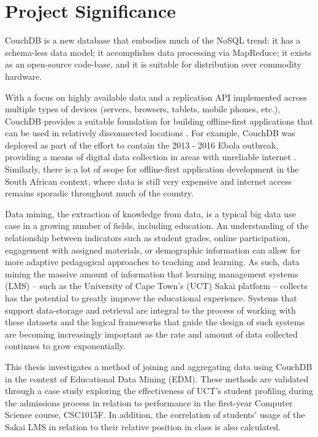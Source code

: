 \section{Project Significance}
CouchDB \cite{theCouch} is a new database that embodies much of the NoSQL trend: it has a schema-less data model; it accomplishes data processing via MapReduce; it exists as an open-source code-base, and it is suitable for distribution over commodity hardware.

With a focus on highly available data and a replication API implemented across multiple types of devices (servers, browsers, tablets, mobile phones, etc.), CouchDB provides a suitable foundation for building offline-first applications that can be used in relatively disconnected locations \cite{ebola2017}. For example, CouchDB was deployed as part of the effort to contain the 2013 - 2016 Ebola outbreak, providing a means of digital data collection in areas with unreliable internet \cite{ebola2017}. Similarly, there is a lot of scope for offline-first application development in the South African context, where data is still very expensive and internet access remains sporadic throughout much of the country.

Data mining, the extraction of knowledge from data, is a typical big data use case in a growing number of fields, including education. An understanding of the relationship between indicators such as student grades, online participation, engagement with assigned materials, or demographic information can allow for more adaptive pedagogical approaches to teaching and learning. As such, data mining the massive amount of information that learning management systems (LMS) – such as the University of Cape Town's (UCT) Sakai platform \cite{sakai} – collects has the potential to greatly improve the educational experience. Systems that support data-storage and retrieval are integral to the process of working with these datasets and the logical frameworks that guide the design of such systems are becoming increasingly important as the rate and amount of data collected continues to grow exponentially.

This thesis investigates a method of joining and aggregating data using CouchDB in the context of Educational Data Mining (EDM). These methods are validated through a case study exploring the effectiveness of UCT's student profiling during the admissions process in relation to performance in the first-year Computer Science course, CSC1015F. In addition, the correlation of students' usage of the Sakai LMS in relation to their relative position in class is also calculated.

